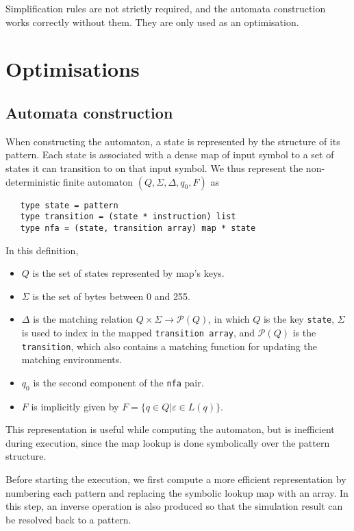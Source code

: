 Simplification rules are not strictly required, and the automata construction
works correctly without them. They are only used as an optimisation.


\section{Optimisations}
\label{opts}

\subsection{Automata construction}

When constructing the automaton, a state is represented by the structure of its
pattern. Each state is associated with a dense map of input symbol to a set of
states it can transition to on that input symbol. We thus represent the
non-deterministic finite automaton $(Q, \Sigma, \Delta, q_0, F)$ as

\begin{lstlisting}
   type state = pattern
   type transition = (state * instruction) list
   type nfa = (state, transition array) map * state
\end{lstlisting}

In this definition,

\begin{itemize}
   \item $Q$ is the set of states represented by map's keys.
   \item $\Sigma$ is the set of bytes between 0 and 255.
   \item $\Delta$ is the matching relation $Q \times \Sigma \to \mathcal{P}(Q)$,
      in which $Q$ is the key \texttt{state}, $\Sigma$ is used to index in the
      mapped \texttt{transition array}, and $\mathcal{P}(Q)$ is the
      \texttt{transition}, which also contains a matching function for updating
      the matching environments.
   \item $q_0$ is the second component of the \texttt{nfa} pair.
   \item $F$ is implicitly given by $F = \{ q \in Q | \varepsilon \in L(q) \}$.
\end{itemize}

This representation is useful while computing the automaton, but is inefficient
during execution, since the map lookup is done symbolically over the pattern
structure.

Before starting the execution, we first compute a more efficient representation
by numbering each pattern and replacing the symbolic lookup map with an array.
In this step, an inverse operation is also produced so that the simulation
result can be resolved back to a pattern.

